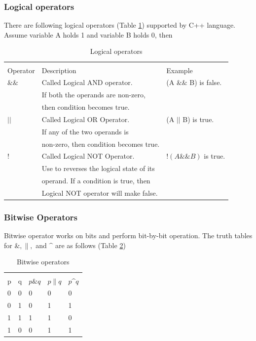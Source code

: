 \documentclass{book}
\begin{document}
\subsubsection{Logical operators}

There are following logical operators (Table \ref{logop}) supported by C++ language. Assume variable A holds 1 and variable B holds 0, then

\begin{table}[h]
\tiny
\centering 
\begin{tabular}{lll} \hline \\ 
Operator	& Description	& Example \\ \hline 
$\&\&$ &	Called Logical AND operator. &	(A $\&\&$ B) is false. \\
& If both the operands are non-zero,  & \\
& then condition becomes true. & \\
$||$ &	Called Logical OR Operator. &(A $||$ B) is true. \\
& If any of the two operands is & \\
& non-zero, then condition becomes true. & \\
$!$ &	Called Logical NOT Operator. &	$!(A \&\& B)$ is true. \\
& Use to reverses the logical state of its & \\
& operand. If a condition is true, then & \\
& Logical NOT operator will make false. & \\ \hline 
\end{tabular}
\caption{Logical operators}
\label{logop}
\end{table}

\subsubsection{Bitwise Operators}

Bitwise operator works on bits and perform bit-by-bit operation. The truth tables for $\&, \|,$ and $\^$ are as follows (Table \ref{bitwop})

\begin{table}[h]

\centering 
\begin{tabular}{lllll} \hline \\
p	& q	& $p \& q$ &	$p \| q$ &	$p \^ q$  \\ \hline 
0	& 0	& 0	& 0	& 0 \\
0	& 1	& 0	& 1	& 1 \\
1	& 1	& 1	& 1	& 0 \\
1	& 0	& 0	& 1	& 1 \\ \hline 
\end{tabular}
\caption{Bitwise operators}
\label{bitwop}
\end{table}
\end{document}
